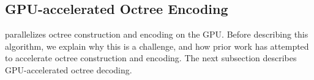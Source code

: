 \subsection{GPU-accelerated Octree Encoding}\label{sec:octree-encode-gpu}

\gsnfs{} parallelizes octree construction and encoding on the GPU.
%
Before describing this algorithm, we explain why this is a challenge, and how prior work has attempted to accelerate octree construction and encoding.
%
The next subsection describes GPU-accelerated octree decoding.



